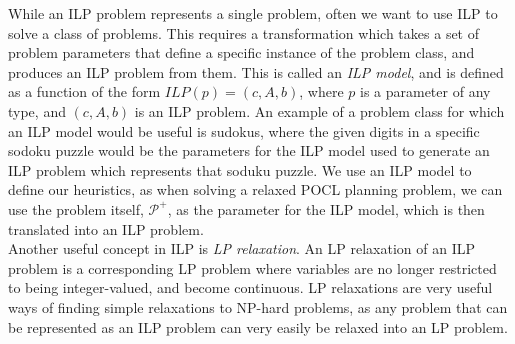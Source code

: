 While an ILP problem represents a single problem, often we want to use ILP to solve a class of problems. This requires a transformation which takes a set of problem parameters that define a specific instance of the problem class, and produces an ILP problem from them. This is called an \textit{ILP model}, and is defined as a function of the form $ILP(p)=(c,A,b)$, where $p$ is a parameter of any type, and $(c,A,b)$ is an ILP problem. An example of a problem class for which an ILP model would be useful is sudokus, where the given digits in a specific sodoku puzzle would be the parameters for the ILP model used to generate an ILP problem which represents that soduku puzzle. We use an ILP model to define our heuristics, as when solving a relaxed POCL planning problem, we can use the problem itself, $\mathcal{P^+}$, as the parameter for the ILP model, which is then translated into an ILP problem.\\

Another useful concept in ILP is \textit{LP relaxation}. An LP relaxation of an ILP problem is a corresponding LP problem where variables are no longer restricted to being integer-valued, and become continuous. LP relaxations are very useful ways of finding simple relaxations to NP-hard problems, as any problem that can be represented as an ILP problem can very easily be relaxed into an LP problem. 
